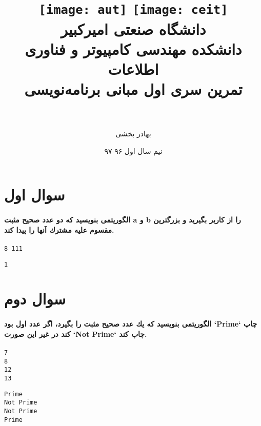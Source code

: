 \documentclass[paper=a4, fontsize=11pt]{article}
\title{
\normalfont\normalsize
\texttt{[image: aut]}
\hspace{5cm}
\texttt{[image: ceit]} \\
\textsc دانشگاه صنعتی امیرکبیر \\
\textsc دانشکده مهندسی کامپیوتر و فناوری اطلاعات
\horrule{0.5pt} \\ [0.4cm] %
\huge تمرین سری اول مبانی برنامه‌نویسی \\ %
\horrule{2pt} \\ [0.5cm] %
}
\author{بهادر بخشی}
\date{\normalsize{نیم سال اول ۹۶‫-‬۹۷}} %
\numberwithin{equation}{section} %
\numberwithin{figure}{section} %
\numberwithin{table}{section} %
\begin{document}
\maketitle %

\section{سوال اول}
\paragraph{
الگوريتمی بنويسيد كه دو عدد صحيح مثبت a و b را از كاربر بگيريد و بزرگترين مقسوم عليه مشترك آنها را پيدا كند.
}

\begin{verbatim}
8 111
\end{verbatim}
\begin{verbatim}
1
\end{verbatim}

\section{سوال دوم}
\paragraph{
الگوريتمی بنويسيد كه يك عدد صحيح مثبت را بگيرد، اگر عدد اول بود `Prime` چاپ كند در غير اين صورت `Not Prime` چاپ كند.
}

\begin{verbatim}
7
8
12
13
\end{verbatim}
\begin{verbatim}
Prime
Not Prime
Not Prime
Prime
\end{verbatim}
\end{document}
